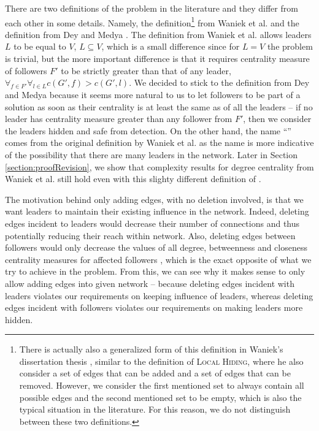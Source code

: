 There are two definitions of the \HL problem in the literature and they differ from each other in some details.
Namely, the definition\footnote{
    There is actually also a generalized form of this definition in Waniek's dissertation thesis \cite{WaniekPhD2017},
    similar to the definition of \textsc{Local Hiding},
    where he also consider a set of edges that can be added and a set of edges that can be removed.
    However, we consider the first mentioned set to always contain all possible edges and the second mentioned set
    to be empty, which is also the typical situation in the literature.
    For this reason, we do not distinguish between these two definitions.
}
from Waniek et al. \cite{Waniek2017} and the definition from Dey and Medya \cite{Dey2019}.
The definition from Waniek et al. \cite{Waniek2017} allows leaders $L$ to be equal to $V$, $L \subseteq V$,
which is a small difference since for $L = V$ the problem is trivial, but the more important difference is that
it requires centrality measure of followers $F'$ to be strictly greater than that of any leader,
$\forall_{f \in F'} \forall_{l \in L} c(G', f) > c(G', l)$.
We decided to stick to the definition from Dey and Medya \cite{Dey2019} because it seems more natural to us to let followers
to be part of a solution as soon as their centrality is at least the same as of all the leaders --
if no leader has centrality measure greater than any follower from $F'$, then
we consider the leaders hidden and safe from detection.
On the other hand, the name ``\HL'' comes from the original definition by Waniek et al. as
the name is more indicative of the possibility that there are many leaders in the network.
Later in Section \ref{section:proofRevision}, we show that complexity results for degree centrality
from Waniek et al. \cite{Waniek2017} still hold even with this slighty different definition of \HLshort.

The motivation behind only adding edges, with no deletion involved, is that we want leaders to maintain
their existing influence in the network.
Indeed, deleting edges incident to leaders would decrease their number of connections and thus potentially
reducing their reach within network.
Also, deleting edges between followers would only decrease the values of all degree, betweenness and closeness
centrality measures for affected followers \cite{Waniek2016},
which is the exact opposite of what we try to achieve in the \HL problem.
From this, we can see why it makes sense to only allow adding edges into given network --
because deleting edges incident with leaders violates our requirements on keeping influence of leaders,
whereas deleting edges incident with followers violates our requirements on making leaders more hidden.

